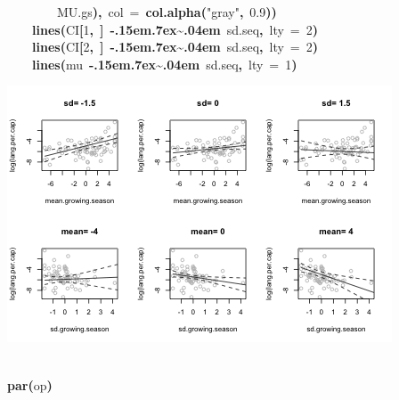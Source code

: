 \documentclass{article}
\makeatletter
\newcommand{\hlnumber}[1]{\textcolor[rgb]{0,0,0}{#1}}%
\newcommand{\hlfunctioncall}[1]{\textcolor[rgb]{.5,0,.33}{\textbf{#1}}}%
\newcommand{\hlstring}[1]{\textcolor[rgb]{.6,.6,1}{#1}}%
\newcommand{\hlkeyword}[1]{\textbf{#1}}%
\newcommand{\hlargument}[1]{\textcolor[rgb]{.69,.25,.02}{#1}}%
\newcommand{\hlsymbol}[1]{#1}%
\def\urltilda{\kern -.15em\lower .7ex\hbox{\~{}}\kern .04em}%
\newcommand{\hlstd}[1]{\textcolor[rgb]{0,0,0}{#1}}%
\newenvironment{kframe}{%
 \def\FrameCommand##1{\hskip\@totalleftmargin \hskip-\fboxsep
 \colorbox{shadecolor}{##1}\hskip-\fboxsep
     \hskip-\linewidth \hskip-\@totalleftmargin \hskip\columnwidth}%
 \MakeFramed {\advance\hsize-\width
   \@totalleftmargin\z@ \linewidth\hsize
   \@setminipage}}%
 {\par\unskip\endMakeFramed}
\newenvironment{knitrout}{}{} %
\makeatother
\begin{document}
\begin{knitrout}
{\begin{kframe}
\begin{flushleft}
\hlstd{}{\ }{\ }{\ }{\ }{\ }{\ }{\ }{\ }\hlsymbol{MU.gs}\hlkeyword{)}\hlkeyword{,}{\ }\hlargument{col}{\ }\hlargument{=}{\ }\hlfunctioncall{col.alpha}\hlkeyword{(}\hlstring{"gray"}\hlkeyword{,}{\ }\hlnumber{0.9}\hlkeyword{)}\hlkeyword{)}\hspace*{\fill}\\
\hlstd{}{\ }{\ }{\ }{\ }\hlfunctioncall{lines}\hlkeyword{(}\hlsymbol{CI}\hlkeyword{[}\hlnumber{1}\hlkeyword{,}{\ }\hlkeyword{]}{\ }\hlkeyword{\urltilda{}}{\ }\hlsymbol{sd.seq}\hlkeyword{,}{\ }\hlargument{lty}{\ }\hlargument{=}{\ }\hlnumber{2}\hlkeyword{)}\hspace*{\fill}\\
\hlstd{}{\ }{\ }{\ }{\ }\hlfunctioncall{lines}\hlkeyword{(}\hlsymbol{CI}\hlkeyword{[}\hlnumber{2}\hlkeyword{,}{\ }\hlkeyword{]}{\ }\hlkeyword{\urltilda{}}{\ }\hlsymbol{sd.seq}\hlkeyword{,}{\ }\hlargument{lty}{\ }\hlargument{=}{\ }\hlnumber{2}\hlkeyword{)}\hspace*{\fill}\\
\hlstd{}{\ }{\ }{\ }{\ }\hlfunctioncall{lines}\hlkeyword{(}\hlsymbol{mu}{\ }\hlkeyword{\urltilda{}}{\ }\hlsymbol{sd.seq}\hlkeyword{,}{\ }\hlargument{lty}{\ }\hlargument{=}{\ }\hlnumber{1}\hlkeyword{)}\hspace*{\fill}\\
\hlstd{}\hlkeyword{\usebox{\hlnormalsizeboxclosebrace}}\mbox{}
\normalfont
\end{flushleft}
\includegraphics{lang-grow-fig} \begin{flushleft}
\ttfamily\noindent
\hspace*{\fill}\\
\hlstd{}\hlfunctioncall{par}\hlkeyword{(}\hlsymbol{op}\hlkeyword{)}\mbox{}
\normalfont
\end{flushleft}
\end{kframe}}
\end{knitrout}
\end{document}
